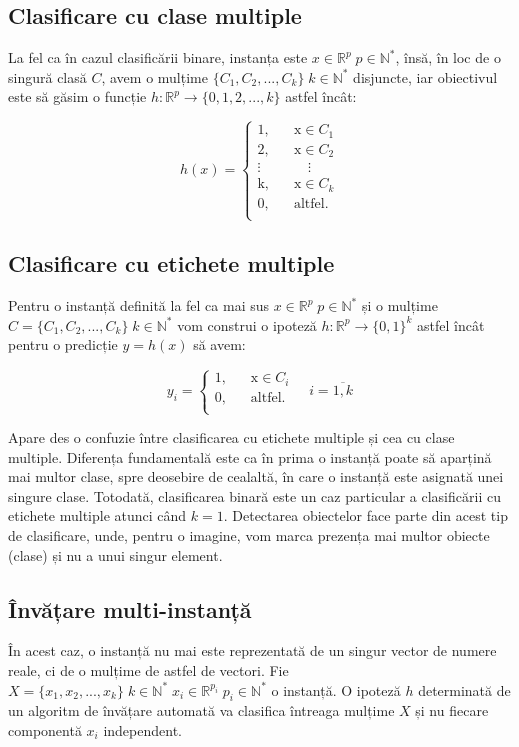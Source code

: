 \documentclass[11pt]{article}
\begin{document}
\subsection{Clasificare cu clase multiple}
La fel ca în cazul clasificării binare, instanța este $x\in\mathbb{R}^p \; p\in\mathbb{N^*}$, însă, în loc de o singură clasă $C$, avem o mulțime $\{C_1,C_2,...,C_k\} \; k\in\mathbb{N^*}$ disjuncte, iar obiectivul este să găsim o funcție $h:\mathbb{R}^p\rightarrow\{0,1,2,...,k\}$ astfel încât:

\[
h(x)=
	\begin{cases}
		\text{1,} &\quad\text{x}\in\text{$C_1$} \\
		\text{2,} &\quad\text{x}\in\text{$C_2$} \\
		\vdots &\quad\quad\vdots \\
		\text{k,} &\quad\text{x}\in\text{$C_k$} \\
		\text{0,} &\quad\text{altfel.} \\
	\end{cases}
\]

\subsection{Clasificare cu etichete multiple}
Pentru o instanță definită la fel ca mai sus $x\in\mathbb{R}^p \; p\in\mathbb{N^*}$ și o mulțime $C=\{C_1,C_2,...,C_k\} \; k\in\mathbb{N^*}$ vom construi o ipoteză $h:\mathbb{R}^p\rightarrow\{0, 1\}^k$ astfel încât pentru o predicție $y=h(x)$ să avem:

\[
y_i=
	\begin{cases}
		\text{1,} &\quad\text{x}\in\text{$C_i$} \\
		\text{0,} &\quad\text{altfel.} \\
	\end{cases}
\quad i=\overline{1,k}
\]

Apare des o confuzie între clasificarea cu etichete multiple și cea cu clase multiple. Diferența fundamentală este ca în prima o instanță poate să aparțină mai multor clase, spre deosebire de cealaltă, în care o instanță este asignată unei singure clase. Totodată, clasificarea binară este un caz particular a clasificării cu etichete multiple atunci când $k=1$. Detectarea obiectelor face parte din acest tip de clasificare, unde, pentru o imagine, vom marca prezența mai multor obiecte (clase) și nu a unui singur element.

\subsection{Învățare multi-instanță}
În acest caz, o instanță nu mai este reprezentată de un singur vector de numere reale, ci de o mulțime de astfel de vectori. Fie $X=\{x_1, x_2,...,x_k\} \; k\in\mathbb{N^*} \; x_i\in\mathbb{R}^{p_i} \; p_i\in\mathbb{N^*}$ o instanță. O ipoteză $h$ determinată de un algoritm de învățare automată va clasifica întreaga mulțime $X$ și nu fiecare componentă $x_i$ independent.\\
\end{document}
